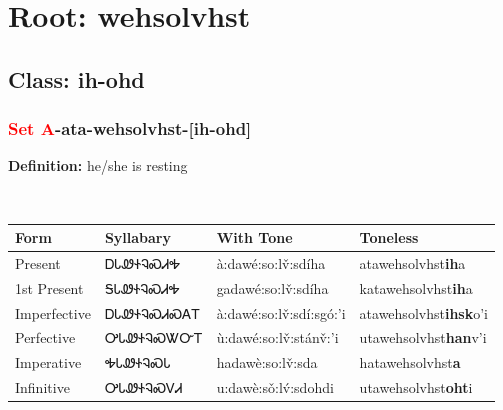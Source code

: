 \needspace{4in}
\section*{Root: wehsolvhst}
\nopagebreak
{}
\needspace{3in}
\subsection*{Class: ih-ohd}
\nopagebreak
\needspace{2in}
\subsubsection*{\textcolor{Red}{Set A}{-}ata{-}\textbf{wehsolvhst}{-}[ih-ohd]}
\nopagebreak
\textbf{Definition: } he/she is resting
\\[0.5em]
\begin{tabularx}{\textwidth}{l X X X}%
\toprule%
\textbf{Form}&\textbf{Syllabary}&\textbf{With Tone}&\textbf{Toneless}\\%
\midrule%
Present&ᎠᏓᏪᏐᎸᏍᏗᎭ&à:dawé:so:lv̌:sdíha&atawehsolvhst\textbf{ih}a\\%
1st Present&ᎦᏓᏪᏐᎸᏍᏗᎭ&gadawé:so:lv̌:sdíha&katawehsolvhst\textbf{ih}a\\%
Imperfective&ᎠᏓᏪᏐᎸᏍᏗᏍᎪᎢ&à:dawé:so:lv̌:sdí:sgó:’i&atawehsolvhst\textbf{ihsk}o'i\\%
Perfective&ᎤᏓᏪᏐᎸᏍᏔᏅᎢ&ù:dawé:so:lv̌:stánv̌:’i&utawehsolvhst\textbf{han}v'i\\%
Imperative&ᎭᏓᏪᏐᎸᏍᏓ&hadawè:so:lv̌:sda&hatawehsolvhst\textbf{a}\\%
Infinitive&ᎤᏓᏪᏐᎸᏍᏙᏗ&u:dawè:sǒ:lv́:sdohdi&utawehsolvhst\textbf{oht}i\\%
\bottomrule%
\end{tabularx}
\\[1em]
